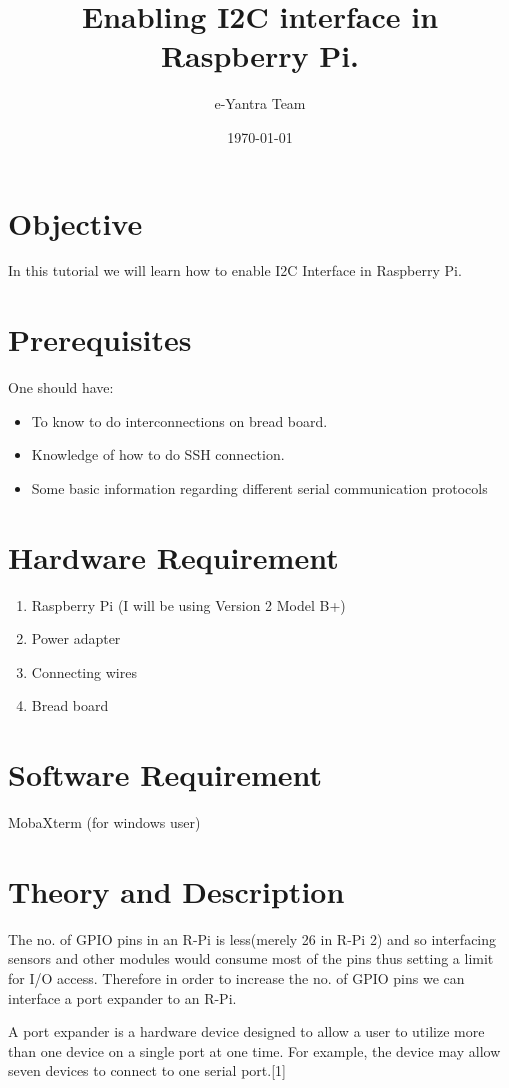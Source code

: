 \documentclass[11pt,a4paper]{article}
\title{Enabling I2C interface in Raspberry Pi.}
\author{e-Yantra Team}
\date{\today}
\begin{document}
	\maketitle
	\newpage
	\tableofcontents
	\newpage
	\section{Objective}
	In this tutorial we will learn how to enable I2C Interface in Raspberry Pi.
	\section{Prerequisites}
	One should have:
	\begin{itemize}
		\item To know to do interconnections on bread board.
		\item Knowledge of how to do SSH connection.
		\item Some basic information regarding different serial communication \newline protocols
	\end{itemize}
	\section{Hardware Requirement}
	\begin{enumerate}
		\item Raspberry Pi (I will be using Version 2 Model B+)
		\item Power adapter
		\item Connecting wires
		\item Bread board
	\end{enumerate}
	\section{Software Requirement}
	MobaXterm (for windows user) 
	
	\newpage
	\section{Theory and Description}
	The no. of GPIO pins in an R-Pi is less(merely 26 in R-Pi 2) and so interfacing sensors and other modules would consume most of the pins thus setting a limit for I/O access. Therefore in order to increase the no. of GPIO pins we can interface a port expander to an R-Pi.
	
	A port expander is a hardware device designed to allow a user to utilize more than one device on a single port at one time. For example, the device may allow seven devices to connect to one serial port.[1]
	
\end{document}
